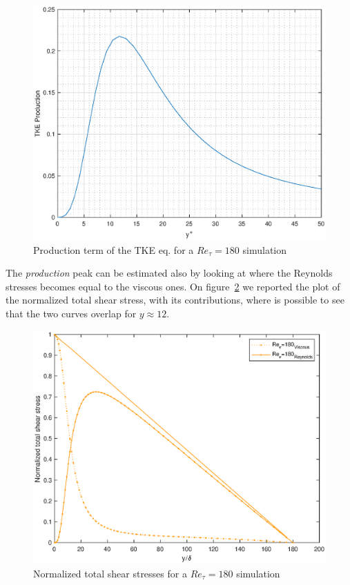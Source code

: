 \begin{figure}
\begin{center}
\includegraphics[scale=0.55]{grafici/tke_prod_180.eps}
\caption{Production term of the TKE eq. for a $Re_{\tau}=180$ simulation}
\label{tke:prod:180}
\end{center} 
\end{figure}

The \emph{production} peak can be estimated also by looking at where the Reynolds stresses becomes equal to the viscous ones.
On figure~\ref{stresses:180} we reported the plot of the normalized total shear stress, with its contributions, where is possible to see that the two curves overlap for $y\approx 12$.\par


\begin{figure}
\begin{center}
\includegraphics[scale=0.55]{grafici/stresses_180.eps}
\caption{Normalized total shear stresses for a $Re_{\tau}=180$ simulation}
\label{stresses:180}
\end{center} 
\end{figure}